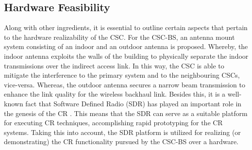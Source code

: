 \subsection{Hardware Feasibility}
Along with other ingredients, it is essential to outline certain aspects that pertain to the hardware realizability of the CSC. For the CSC-BS, an antenna mount system consisting of an indoor and an outdoor antenna is proposed. Whereby, the indoor antenna exploits the walls of the building to physically separate the indoor transmissions over the indirect access link. In this way, the CSC is able to mitigate the interference to the primary system and to the neighbouring CSCs, vice-versa. Whereas, the outdoor antenna secures a narrow beam transmission to enhance the link quality for the wireless backhaul link. Besides this, it is a well-known fact that Software Defined Radio (SDR) has played an important role in the genesis of the CR \cite{Jondral05}. This means that the SDR can serve as a suitable platform for executing CR techniques, accomplishing rapid prototyping for the CR systems. Taking this into account, the SDR platform is utilized for realizing (or demonstrating) the CR functionality pursued by the CSC-BS over a hardware.


